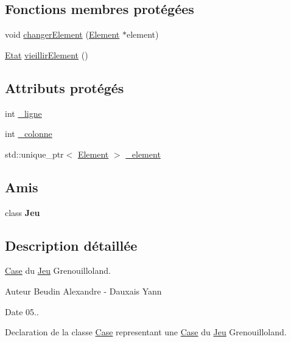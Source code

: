 \subsection*{Fonctions membres protégées}
\begin{DoxyCompactItemize}
\item 
void \hyperlink{classgrenouilloland_1_1Case_ab57246e24672017b0cb29484ca6d2921}{changer\-Element} (\hyperlink{classgrenouilloland_1_1Element}{Element} $\ast$element)
\item 
\hyperlink{classgrenouilloland_1_1Etat}{Etat} \hyperlink{classgrenouilloland_1_1Case_a9e746c0dba7c7bcf166ca88bb10d9b01}{vieillir\-Element} ()
\end{DoxyCompactItemize}
\subsection*{Attributs protégés}
\begin{DoxyCompactItemize}
\item 
int \hyperlink{classgrenouilloland_1_1Case_a852142435ab4a556c148274cccbcfebc}{\-\_\-ligne}
\item 
int \hyperlink{classgrenouilloland_1_1Case_a44c61a8ab51a6fedb92c9a92c7eeb9eb}{\-\_\-colonne}
\item 
std\-::unique\-\_\-ptr$<$ \hyperlink{classgrenouilloland_1_1Element}{Element} $>$ \hyperlink{classgrenouilloland_1_1Case_a3ffd88341a2aee34d145ddf5a986ab37}{\-\_\-element}
\end{DoxyCompactItemize}
\subsection*{Amis}
\begin{DoxyCompactItemize}
\item 
\hypertarget{classgrenouilloland_1_1Case_a8347c819d94b3816d06cf9255691923d}{class {\bfseries Jeu}}\label{classgrenouilloland_1_1Case_a8347c819d94b3816d06cf9255691923d}

\end{DoxyCompactItemize}


\subsection{Description détaillée}
\hyperlink{classgrenouilloland_1_1Case}{Case} du \hyperlink{classgrenouilloland_1_1Jeu}{Jeu} Grenouilloland. 

\begin{DoxyAuthor}{Auteur}
Beudin Alexandre -\/ Dauxais Yann 
\end{DoxyAuthor}
\begin{DoxyDate}{Date}
05..
\end{DoxyDate}
Declaration de la classe \hyperlink{classgrenouilloland_1_1Case}{Case} representant une \hyperlink{classgrenouilloland_1_1Case}{Case} du \hyperlink{classgrenouilloland_1_1Jeu}{Jeu} Grenouilloland. 

